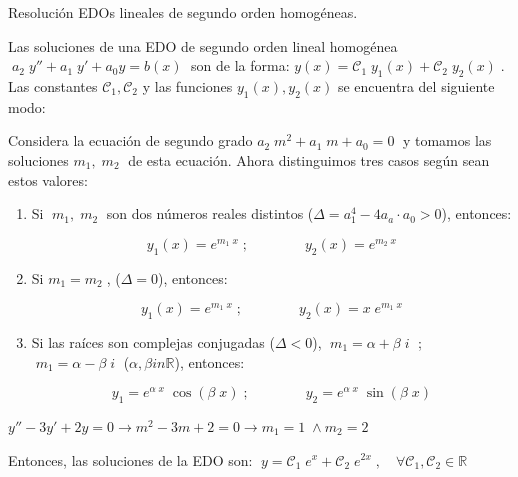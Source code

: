 \begin{teor}{Resolución EDOs lineales de segundo orden homogéneas.}

Las soluciones de una EDO de segundo orden lineal homogénea $\; a_2\; y'' + a_1	\; y' + a_0 y= b(x) \;$ son de la forma: $y(x)=\mathcal{C}_1\; y_1(x)+\mathcal{C}_2\; y_2(x)\;$. Las constantes $\mathcal{C}_1, \mathcal{C}_2$ y las funciones $y_1(x), y_2(x)$ se encuentra del siguiente modo:

Considera la ecuación de segundo grado \; $a_2\;  m^2 + a_1 \; m + a_0=0\; $ y tomamos las soluciones \; $m_1,\;  m_2\; $ de esta ecuación. Ahora distinguimos tres casos según sean estos valores:

\begin{enumerate}

\item  Si $\; m_1,\; m_2\; $	son dos números reales distintos ($\Delta=a_1^4-4a_a\cdot a_0>0$), entonces:

\begin{equation*}
	y_1(x)=e^{m_1\; x} \; ;  \qquad  \qquad y_2(x)=e^{m_2\; x}
\end{equation*}

\item Si $m_1=m_2\; $,  ($\Delta=0$), entonces:

\begin{equation*}
	y_1(x)=e^{m_1\; x} \; ;  \qquad  \qquad y_2(x)=x\; e^{m_1\; x}
\end{equation*}

\item Si las raíces son complejas conjugadas ($\Delta<0$), 
$\; m_1=\alpha + \beta \; i\; $ ; $\; m_1=\alpha - \beta \; i\; $ ($\alpha, \beta in \mathbb R$), entonces:

\begin{equation*}
	y_1=e^{\alpha\; x}\; \cos (\beta\; x) \; ;  \qquad  \qquad y_2=e^{\alpha\; x}\; \sin (\beta\; x)
\end{equation*}
\end{enumerate}
\end{teor}

\vspace{4mm}

\begin{ejem}
$y''-3y'+2y=0 \to m^2-3m+2=0 \to m_1=1 \; \wedge m_2=2\; $

Entonces, las soluciones de la EDO son: $\; y=\mathcal{C}_1\; e^x +\mathcal{C}_2\; e^{2x}\; , \quad \forall \mathcal{C}_1,\mathcal{C}_2 \in \mathbb R$  	
\end{ejem}

